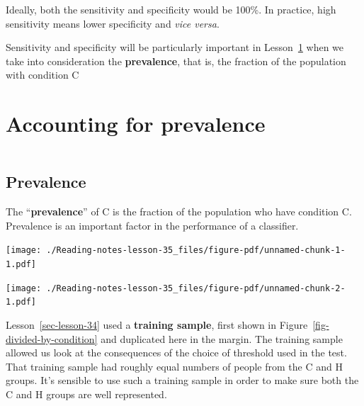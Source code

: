 \documentclass[
  letterpaper,
  DIV=11,
  numbers=noendperiod,
  oneside]{scrreprt}
\newcommand{\Ptest}{\mathbb{P}}
\newcommand{\Ntest}{\mathbb{N}}
\newcommand{\given}{\ |\!\!|\  }
\begin{document}
Ideally, both the sensitivity and specificity would be 100\%. In
practice, high sensitivity means lower specificity and \emph{vice
versa}.

Sensitivity and specificity will be particularly important in
Lesson~\ref{sec-lesson-35} when we take into consideration the
\textbf{prevalence}, that is, the fraction of the population with
condition C

\hypertarget{sec-lesson-35}{%
\chapter{Accounting for prevalence}\label{sec-lesson-35}}

\[\newcommand{\Ptest}{\mathbb{P}}
\newcommand{\Ntest}{\mathbb{N}}
\newcommand{\given}{\ |\!\!|\  }\]

\hypertarget{prevalence}{%
\section{Prevalence}\label{prevalence}}

The ``\textbf{prevalence}'' of C is the fraction of the population who
have condition C. Prevalence is an important factor in the performance
of a classifier.

{}

\begin{marginfigure}

{\centering \texttt{[image: ./Reading-notes-lesson-35\_files/figure-pdf/unnamed-chunk-1-1.pdf]}

}

\end{marginfigure}

\begin{marginfigure}

{\centering \texttt{[image: ./Reading-notes-lesson-35\_files/figure-pdf/unnamed-chunk-2-1.pdf]}

}

\end{marginfigure}

Lesson~\ref{sec-lesson-34} used a \textbf{training sample}, first shown
in Figure~\ref{fig-divided-by-condition} and duplicated here in the
margin. The training sample allowed us look at the consequences of the
choice of threshold used in the test. That training sample had roughly
equal numbers of people from the C and H groups. It's sensible to use
such a training sample in order to make sure both the C and H groups are
well represented.
\end{document}
